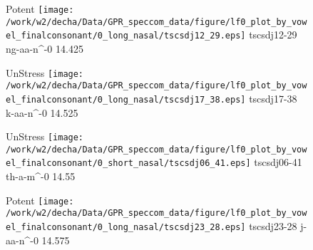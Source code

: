 \documentclass{article}
\begin{document}
\begin{figure}[t]
\begin{minipage}[b]{.24\textwidth}
\colorbox{Apricot}{Potent}
\centering
\texttt{[image: /work/w2/decha/Data/GPR\_speccom\_data/figure/lf0\_plot\_by\_vowel\_finalconsonant/0\_long\_nasal/tscsdj12\_29.eps]}
tscsdj12-29 ng-aa-n\textasciicircum-0 14.425
\end{minipage}
\begin{minipage}[b]{.24\textwidth}
UnStress
\centering
\texttt{[image: /work/w2/decha/Data/GPR\_speccom\_data/figure/lf0\_plot\_by\_vowel\_finalconsonant/0\_long\_nasal/tscsdj17\_38.eps]}
tscsdj17-38 k-aa-n\textasciicircum-0 14.525
\end{minipage}
\begin{minipage}[b]{.24\textwidth}
UnStress
\centering
\texttt{[image: /work/w2/decha/Data/GPR\_speccom\_data/figure/lf0\_plot\_by\_vowel\_finalconsonant/0\_short\_nasal/tscsdj06\_41.eps]}
tscsdj06-41 th-a-m\textasciicircum-0 14.55
\end{minipage}
\begin{minipage}[b]{.24\textwidth}
\colorbox{Apricot}{Potent}
\centering
\texttt{[image: /work/w2/decha/Data/GPR\_speccom\_data/figure/lf0\_plot\_by\_vowel\_finalconsonant/0\_long\_nasal/tscsdj23\_28.eps]}
tscsdj23-28 j-aa-n\textasciicircum-0 14.575
\end{minipage}
\end{figure}
\end{document}
